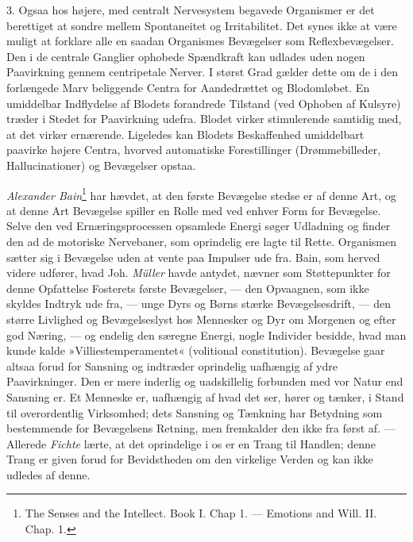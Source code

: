 \documentclass[12pt,a4paper,openany]{book}
\newcommand{\opage}[1]{\marginnote{\footnotesize\textit{[#1]}}}
\begin{document}
3. Ogsaa hos højere, med centralt Nervesystem begavede Organismer er det
berettiget at sondre mellem Spontaneitet og Irritabilitet. Det synes
ikke at være muligt at forklare alle en saadan Organismes Bevægelser som
Reflexbevægelser. Den i de centrale Ganglier ophobede Spændkraft kan
udlades uden nogen Paavirkning gennem centripetale Nerver. I størst Grad
gælder dette om de i den forlængede Marv beliggende Centra for
Aandedrættet og Blodomløbet. En umiddelbar Indflydelse af Blodets
forandrede Tilstand (ved Ophoben af Kulsyre) træder i Stedet for
Paavirkning udefra. Blodet virker stimulerende samtidig med, at det
virker ernærende. Ligeledes kan Blodets Beskaffenhed umiddelbart
paavirke højere Centra, hvorved automatiske Forestillinger
(Drømmebilleder, Hallucinationer) og Bevægelser opstaa.

\emph{Alexander Bain}\footnote[1]{The Senses and the Intellect. Book I.
Chap 1. --- Emotions and Will. II. Chap. 1.} har hævdet, at den første
Bevægelse stedse er af denne Art, og at denne Art Bevægelse spiller en
Rolle med ved enhver Form for Bevægelse. Selve den ved
Ernæringsprocessen opsamlede Energi søger Udladning og finder den ad de
motoriske Nervebaner, som oprindelig ere lagte til Rette. Organismen
sætter sig i Bevægelse uden at vente paa Impulser ude fra. Bain, som
herved videre udfører, hvad Joh. \emph{Müller} havde antydet, nævner som
Støttepunkter for denne Opfattelse Fosterets første Bevægelser, --- den
Opvaagnen, som ikke skyldes Indtryk ude fra, --- unge Dyrs og Børns
stærke Bevægelsesdrift, --- den større Livlighed og Bevægelseslyst hos
Mennesker og Dyr om Morgenen og efter god Næring, --- og endelig den
særegne Energi, nogle Individer besidde, hvad man kunde kalde
»Villiestemperamentet« (volitional
\opage{368}constitution). Bevægelse gaar altsaa forud for Sansning og
indtræder oprindelig uafhængig af ydre Paavirkninger. Den er mere
inderlig og uadskillelig forbunden med vor Natur end Sansning er. Et
Menneske er, uafhængig af hvad det ser, hører og tænker, i Stand til
overordentlig Virksomhed; dets Sansning og Tænkning har Betydning som
bestemmende for Bevægelsens Retning, men fremkalder den ikke fra først
af. --- Allerede \emph{Fichte} lærte, at det oprindelige i os er en
Trang til Handlen; denne Trang er given forud for Bevidstheden om den
virkelige Verden og kan ikke udledes af denne.
\end{document}
